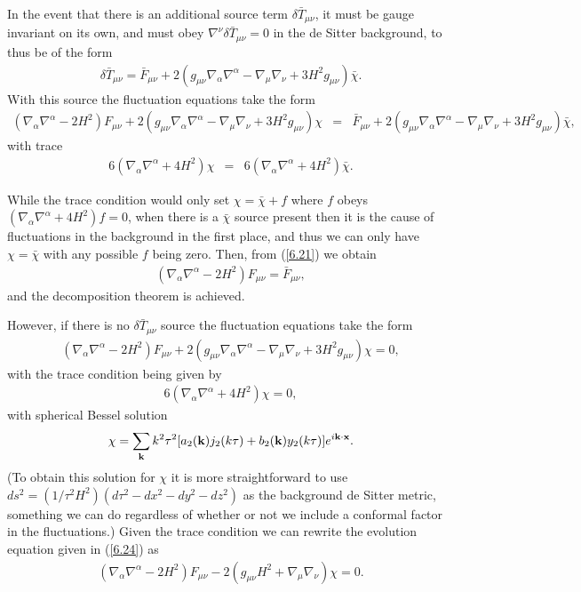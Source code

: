 \documentclass[aps,onecolumn,10pt]{revtex4}
\numberwithin{equation}{section}
\numberwithin{equation}{section}
\begin{document}
In the event that there is an additional source term $\delta\bar{T}_{\mu\nu}$, it must be gauge invariant on its own, and must obey $\nabla^{\nu}\delta \bar{T}_{\mu\nu}=0$ in the de Sitter background, to thus be of the form 
%
\begin{eqnarray}
\delta \bar{T}_{\mu\nu}=\bar{F}_{\mu\nu}+2(g_{\mu\nu}\nabla_{\alpha}\nabla^{\alpha}-\nabla_{\mu}\nabla_{\nu}+3H^2g_{\mu\nu})\bar{\chi}.
\label{6.20}
\end{eqnarray}
% 
With this source the fluctuation equations take the form
%
\begin{eqnarray}
(\nabla_{\alpha}\nabla^{\alpha}-2H^2)F_{\mu\nu}+2(g_{\mu\nu}\nabla_{\alpha}\nabla^{\alpha}-\nabla_{\mu}\nabla_{\nu}+3H^2g_{\mu\nu})\chi&=&\bar{F}_{\mu\nu}+2(g_{\mu\nu}\nabla_{\alpha}\nabla^{\alpha}-\nabla_{\mu}\nabla_{\nu}+3H^2g_{\mu\nu})\bar{\chi},
\label{6.21}
\end{eqnarray}
%
with trace
%
\begin{eqnarray}
6(\nabla_{\alpha}\nabla^{\alpha}+4H^2)\chi&=&6(\nabla_{\alpha}\nabla^{\alpha}+4H^2)\bar{\chi}.
\label{6.22}
\end{eqnarray}
% 

While the trace condition would only set $\chi=\bar{\chi}+f$ where $f$ obeys  $(\nabla_{\alpha}\nabla^{\alpha}+4H^2)f=0$, when there is a $\bar{\chi}$ source present then it is the cause of fluctuations in the background in the first place, and thus we can only have $\chi=\bar{\chi}$ with any possible $f$ being zero. Then, from  (\ref{6.21}) we obtain 
%
\begin{eqnarray}
(\nabla_{\alpha}\nabla^{\alpha}-2H^2)F_{\mu\nu}=\bar{F}_{\mu\nu},
\label{6.23}
\end{eqnarray}
%
and the decomposition theorem is achieved.

However, if there is no $\delta \bar{T}_{\mu\nu}$ source the fluctuation equations take the form 
%
\begin{eqnarray}
(\nabla_{\alpha}\nabla^{\alpha}-2H^2)F_{\mu\nu}+2(g_{\mu\nu}\nabla_{\alpha}\nabla^{\alpha}-\nabla_{\mu}\nabla_{\nu}+3H^2g_{\mu\nu})\chi=0,
\label{6.24}
\end{eqnarray}
%
with the trace condition  being given by 
%
\begin{eqnarray}
6(\nabla_{\alpha}\nabla^{\alpha}+4H^2)\chi=0,
\label{6.25a}
\end{eqnarray}
%
with spherical Bessel solution
%
\begin{eqnarray}
\chi=\sum_{\bf k} k^2\tau^2[a_2({\bf k})j_2(k\tau)+b_2 ({\bf k})y_2(k\tau)]e^{i{\bf k}\cdot {\bf x}}.
\label{6.26a}
\end{eqnarray}
%
(To obtain this solution for $\chi$ it is more straightforward to use $ds^2=(1/\tau^2 H^2)(d\tau^2-dx^2-dy^2-dz^2)$ as the background de Sitter metric, something we can do regardless of whether or not we include a conformal factor in the fluctuations.) Given the trace condition we can rewrite the evolution equation given in (\ref{6.24}) as 
%
\begin{eqnarray}
(\nabla_{\alpha}\nabla^{\alpha}-2H^2)F_{\mu\nu}-2(g_{\mu\nu}H^2+\nabla_{\mu}\nabla_{\nu})\chi=0.
\label{6.27a}
\end{eqnarray}
%
\end{document}

